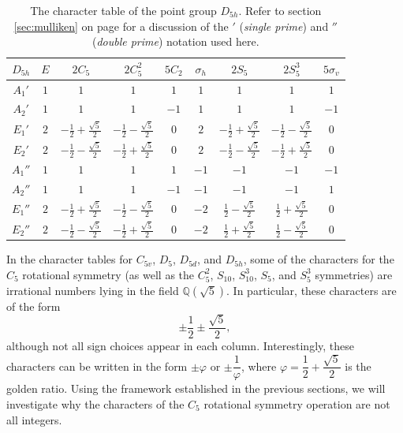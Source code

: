 \documentclass{article}
\begin{document}
    \begin{table}[htbp]
        \centering
        \renewcommand{\arraystretch}{1.5}
        \begin{tabular}{c|cccccccc}
            $D_{5h}$ & $E$ & $2C_5$ & $2C_5^2$ & $5C_2$ & $\sigma_h$ & $2S_5$ & $2S_5^3$ & $5\sigma_v$\\
            \hline
            $A_1'$ & $1$ & $1$ & $1$ & $1$ & $1$ & $1$ & $1$ & $1$\\
            $A_2'$ & $1$ & $1$ & $1$ & $-1$ & $1$ & $1$ & $1$ & $-1$\\
            $E_1'$ & $2$ & $-\frac12+\frac{\sqrt{5}}{2}$ & $-\frac12-\frac{\sqrt{5}}{2}$ & $0$ & $2$ & $-\frac12+\frac{\sqrt{5}}{2}$ & $-\frac12-\frac{\sqrt{5}}{2}$ & $0$\\
            $E_2'$ & $2$ & $-\frac12-\frac{\sqrt{5}}{2}$ & $-\frac12+\frac{\sqrt{5}}{2}$ & $0$ & $2$ & $-\frac12-\frac{\sqrt{5}}{2}$ & $-\frac12+\frac{\sqrt{5}}{2}$ & $0$\\
            $A_1''$ & $1$ & $1$ & $1$ & $1$ & $-1$ & $-1$ & $-1$ & $-1$\\
            $A_2''$ & $1$ & $1$ & $1$ & $-1$ & $-1$ & $-1$ & $-1$ & $1$\\
            $E_1''$ & $2$ & $-\frac12+\frac{\sqrt{5}}{2}$ & $-\frac12-\frac{\sqrt{5}}{2}$ & $0$ & $-2$ & $\frac12-\frac{\sqrt{5}}{2}$ & $\frac12+\frac{\sqrt{5}}{2}$ & $0$\\
            $E_2''$ & $2$ & $-\frac12-\frac{\sqrt{5}}{2}$ & $-\frac12+\frac{\sqrt{5}}{2}$ & $0$ & $-2$ & $\frac12+\frac{\sqrt{5}}{2}$ & $\frac12-\frac{\sqrt{5}}{2}$ & $0$\\
        \end{tabular}
        \caption{The character table of the point group $D_{5h}$. \cite{miessler2014} Refer to section \ref{sec:mulliken} on page \pageref{sec:mulliken} for a discussion of the $'$ (\emph{single prime}) and $''$ (\emph{double prime}) notation used here.}
        \label{tab:d5h}
    \end{table}

    In the character tables for $C_{5v}$, $D_5$, $D_{5d}$, and $D_{5h}$, some of the characters for the $C_5$ rotational symmetry (as well as the $C_5^2$, $S_{10}$, $S_{10}^3$, $S_5$, and $S_5^3$ symmetries) are irrational numbers lying in the field $\mathbb{Q}(\sqrt{5})$. In particular, these characters are of the form \[\pm\dfrac12\pm\dfrac{\sqrt{5}}{2},\] although not all sign choices appear in each column. Interestingly, these characters can be written in the form $\pm\varphi$ or $\pm\dfrac{1}{\varphi}$, where $\varphi=\dfrac12+\dfrac{\sqrt5}{2}$ is the golden ratio. Using the framework established in the previous sections, we will investigate why the characters of the $C_5$ rotational symmetry operation are not all integers.
\end{document}
